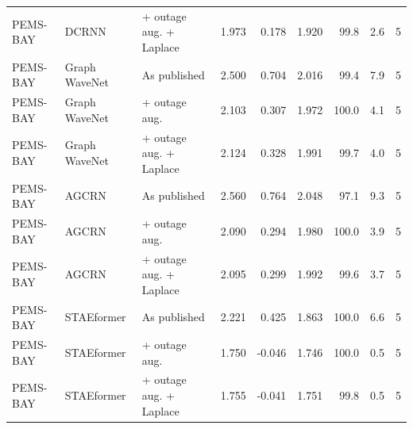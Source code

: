 \begin{tabular}{lllrrrrrr}
PEMS-BAY & DCRNN & + outage aug. + Laplace & 1.973 & 0.178 & 1.920 & 99.8 & 2.6 & 5 \\
PEMS-BAY & Graph WaveNet & As published & 2.500 & 0.704 & 2.016 & 99.4 & 7.9 & 5 \\
PEMS-BAY & Graph WaveNet & + outage aug. & 2.103 & 0.307 & 1.972 & 100.0 & 4.1 & 5 \\
PEMS-BAY & Graph WaveNet & + outage aug. + Laplace & 2.124 & 0.328 & 1.991 & 99.7 & 4.0 & 5 \\
PEMS-BAY & AGCRN & As published & 2.560 & 0.764 & 2.048 & 97.1 & 9.3 & 5 \\
PEMS-BAY & AGCRN & + outage aug. & 2.090 & 0.294 & 1.980 & 100.0 & 3.9 & 5 \\
PEMS-BAY & AGCRN & + outage aug. + Laplace & 2.095 & 0.299 & 1.992 & 99.6 & 3.7 & 5 \\
PEMS-BAY & STAEformer & As published & 2.221 & 0.425 & 1.863 & 100.0 & 6.6 & 5 \\
PEMS-BAY & STAEformer & + outage aug. & 1.750 & -0.046 & 1.746 & 100.0 & 0.5 & 5 \\
PEMS-BAY & STAEformer & + outage aug. + Laplace & 1.755 & -0.041 & 1.751 & 99.8 & 0.5 & 5 \\
\bottomrule
\end{tabular}
